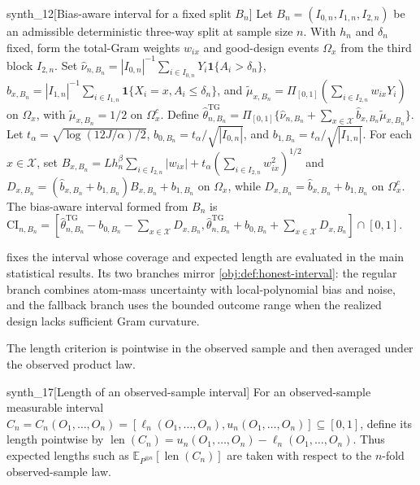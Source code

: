 \begin{definitionv}{synth_12}[Bias-aware interval for a fixed split $B_n$]
Let $B_n=(I_{0,n},I_{1,n},I_{2,n})$ be an admissible deterministic three-way split at sample size $n$. With $h_n$ and $\delta_n$ fixed, form the total-Gram weights $w_{ix}$ and good-design events $\Omega_x$ from the third block $I_{2,n}$. Set $\widehat\nu_{n,B_n}=|I_{0,n}|^{-1}\sum_{i\in I_{0,n}}Y_i\mathbf 1\{A_i>\delta_n\}$, $\widehat b_{x,B_n}=|I_{1,n}|^{-1}\sum_{i\in I_{1,n}}\mathbf 1\{X_i=x,A_i\leq\delta_n\}$, and $\widetilde\mu_{x,B_n}=\Pi_{[0,1]}(\sum_{i\in I_{2,n}}w_{ix}Y_i)$ on $\Omega_x$, with $\widetilde\mu_{x,B_n}=1/2$ on $\Omega_x^c$. Define $\widehat\theta^{\mathrm{TG}}_{n,B_n}=\Pi_{[0,1]}\{\widehat\nu_{n,B_n}+\sum_{x\in\mathcal X}\widehat b_{x,B_n}\widetilde\mu_{x,B_n}\}$. Let $t_\alpha=\sqrt{\log(12J/\alpha)/2}$, $b_{0,B_n}=t_\alpha/\sqrt{|I_{0,n}|}$, and $b_{1,B_n}=t_\alpha/\sqrt{|I_{1,n}|}$. For each $x\in\mathcal X$, set $B_{x,B_n}=Lh_n^\beta\sum_{i\in I_{2,n}}|w_{ix}|+t_\alpha(\sum_{i\in I_{2,n}}w_{ix}^2)^{1/2}$ and $D_{x,B_n}=(\widehat b_{x,B_n}+b_{1,B_n})B_{x,B_n}+b_{1,B_n}$ on $\Omega_x$, while $D_{x,B_n}=\widehat b_{x,B_n}+b_{1,B_n}$ on $\Omega_x^c$. The bias-aware interval formed from $B_n$ is $\mathrm{CI}_{n,B_n}=[\widehat\theta^{\mathrm{TG}}_{n,B_n}-b_{0,B_n}-\sum_{x\in\mathcal X}D_{x,B_n},\widehat\theta^{\mathrm{TG}}_{n,B_n}+b_{0,B_n}+\sum_{x\in\mathcal X}D_{x,B_n}]\cap[0,1]$.
\end{definitionv}

 fixes the interval whose coverage and expected length are evaluated in the main statistical results. Its two branches mirror \cref{obj:def:honest-interval}: the regular branch combines atom-mass uncertainty with local-polynomial bias and noise, and the fallback branch uses the bounded outcome range when the realized design lacks sufficient Gram curvature.

The length criterion is pointwise in the observed sample and then averaged under the observed product law.

\begin{definitionv}{synth_17}[Length of an observed-sample interval]
For an observed-sample measurable interval \(C_n=C_n(O_1,\ldots,O_n)=[\ell_n(O_1,\ldots,O_n),u_n(O_1,\ldots,O_n)]\subseteq[0,1]\), define its length pointwise by \(\operatorname{len}(C_n)=u_n(O_1,\ldots,O_n)-\ell_n(O_1,\ldots,O_n)\). Thus expected lengths such as \(\mathbb E_{P^{\otimes n}}[\operatorname{len}(C_n)]\) are taken with respect to the \(n\)-fold observed-sample law.
\end{definitionv}

